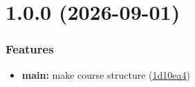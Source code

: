 \documentclass[
  english,
  russian,
  12pt,
  a4paper,
  DIV=11,
  numbers=noendperiod]{scrreprt}
\author{}
\date{}
\providecommand{\tightlist}{%
  \setlength{\itemsep}{0pt}\setlength{\parskip}{0pt}}
\renewcommand*\contentsname{Table of contents}
\newcommand\contentsname{Table of contents}
\begin{document}
\renewcommand*\contentsname{Table of contents}
{
\setcounter{tocdepth}{1}
\tableofcontents
}
\listoffigures
\listoftables

\chapter{1.0.0 (2026-09-01)}\label{section}

\subsection{Features}\label{features}

\begin{itemize}
\tightlist
\item
  \textbf{main:} make course structure
  (\href{https://github.com/serapshi/2026-1--study--simulation--modeling/commit/1d10ea40afe809c3b3f8469ca8acf148efa3d959}{1d10ea4})
\end{itemize}


\printbibliography
\end{document}
